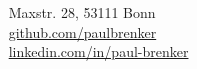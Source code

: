 \documentclass{style/modernsimplecv}
\begin{document}
\begin{minipage}[t]{1\textwidth}
\begin{shaded*}
\begin{minipage}[t]{0.46\textwidth}
            \faEnvelopeO~ Maxstr. 28, 53111 Bonn \\

            \faGithub~ \protect\url{github.com/paulbrenker} \\
            \faLinkedin~ \protect\url{linkedin.com/in/paul-brenker} \\
        \end{minipage}
        \hfill
    \end{shaded*}
\end{minipage}\\[15pt]



\subsection*{}
\vspace{-3em}
\end{document}
